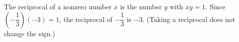 The reciprocal of a nonzero number $x$ is the number $y$ with $xy=1$. Since $\left(-\dfrac{1}{3}\right)(-3)=1$, the reciprocal of $-\dfrac{1}{3}$ is $\boxed{-3}$. (Taking a reciprocal does not change the sign.)
